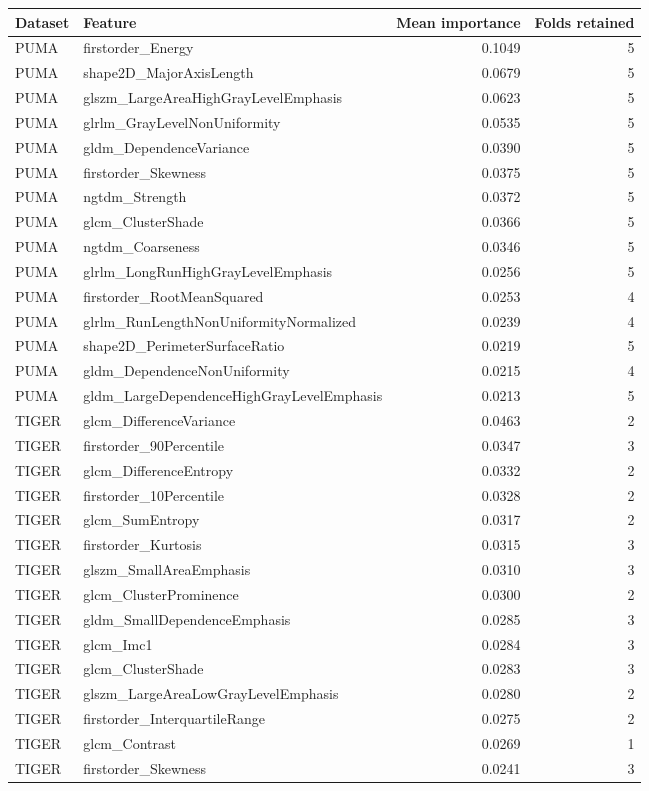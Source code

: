 \begin{tabular}{llrr}
\toprule
Dataset & Feature & Mean importance & Folds retained \\
\midrule
PUMA & firstorder\_Energy & 0.1049 & 5 \\
PUMA & shape2D\_MajorAxisLength & 0.0679 & 5 \\
PUMA & glszm\_LargeAreaHighGrayLevelEmphasis & 0.0623 & 5 \\
PUMA & glrlm\_GrayLevelNonUniformity & 0.0535 & 5 \\
PUMA & gldm\_DependenceVariance & 0.0390 & 5 \\
PUMA & firstorder\_Skewness & 0.0375 & 5 \\
PUMA & ngtdm\_Strength & 0.0372 & 5 \\
PUMA & glcm\_ClusterShade & 0.0366 & 5 \\
PUMA & ngtdm\_Coarseness & 0.0346 & 5 \\
PUMA & glrlm\_LongRunHighGrayLevelEmphasis & 0.0256 & 5 \\
PUMA & firstorder\_RootMeanSquared & 0.0253 & 4 \\
PUMA & glrlm\_RunLengthNonUniformityNormalized & 0.0239 & 4 \\
PUMA & shape2D\_PerimeterSurfaceRatio & 0.0219 & 5 \\
PUMA & gldm\_DependenceNonUniformity & 0.0215 & 4 \\
PUMA & gldm\_LargeDependenceHighGrayLevelEmphasis & 0.0213 & 5 \\
TIGER & glcm\_DifferenceVariance & 0.0463 & 2 \\
TIGER & firstorder\_90Percentile & 0.0347 & 3 \\
TIGER & glcm\_DifferenceEntropy & 0.0332 & 2 \\
TIGER & firstorder\_10Percentile & 0.0328 & 2 \\
TIGER & glcm\_SumEntropy & 0.0317 & 2 \\
TIGER & firstorder\_Kurtosis & 0.0315 & 3 \\
TIGER & glszm\_SmallAreaEmphasis & 0.0310 & 3 \\
TIGER & glcm\_ClusterProminence & 0.0300 & 2 \\
TIGER & gldm\_SmallDependenceEmphasis & 0.0285 & 3 \\
TIGER & glcm\_Imc1 & 0.0284 & 3 \\
TIGER & glcm\_ClusterShade & 0.0283 & 3 \\
TIGER & glszm\_LargeAreaLowGrayLevelEmphasis & 0.0280 & 2 \\
TIGER & firstorder\_InterquartileRange & 0.0275 & 2 \\
TIGER & glcm\_Contrast & 0.0269 & 1 \\
TIGER & firstorder\_Skewness & 0.0241 & 3 \\
\bottomrule
\end{tabular}
